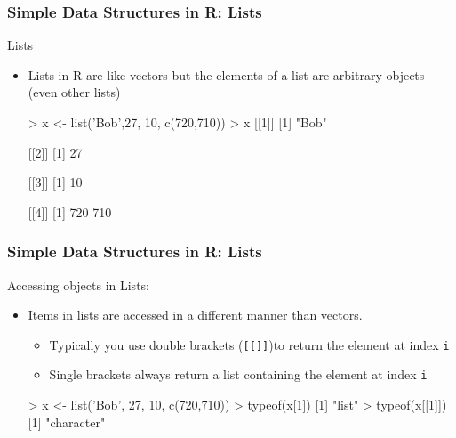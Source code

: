 \documentclass{beamer}
\begin{document}
\begin{frame}[fragile]
  \frametitle{Simple Data Structures in R: Lists}

\Large{Lists}

\begin{itemize}

\item Lists in R are like vectors but the elements of a list are arbitrary objects (even other lists)

\begin{Rcode}
> x <- list('Bob',27, 10, c(720,710))
> x
[[1]]
[1] "Bob"

[[2]]
[1] 27

[[3]]
[1] 10

[[4]]
[1] 720 710
\end{Rcode}

\end{itemize}

\end{frame}

\begin{frame}[fragile]
  \frametitle{Simple Data Structures in R: Lists}

Accessing objects in Lists:

\begin{itemize}

\item Items in lists are accessed in a  different manner than vectors. 

\begin{itemize}
\item Typically you use double brackets (\texttt{[[]]})to return the element at index \texttt{i}

\item Single brackets always return a list containing the element at index \texttt{i}

\end{itemize}

\begin{Rcode}
> x <- list('Bob', 27, 10, c(720,710))
> typeof(x[1])
[1] "list"
> typeof(x[[1]])
[1] "character"
\end{Rcode}

\end{itemize}

\end{frame}
\end{document}
